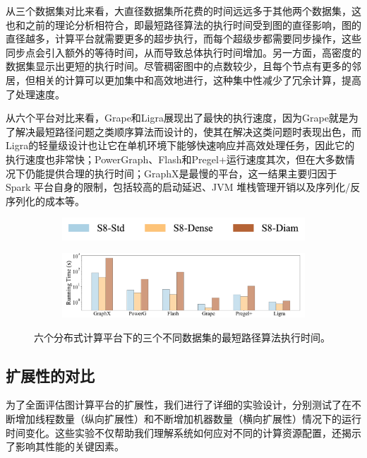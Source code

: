 从三个数据集对比来看，大直径数据集所花费的时间远远多于其他两个数据集，这也和之前的理论分析相符合，即最短路径算法的执行时间受到图的直径影响，图的直径越多，计算平台就需要更多的超步执行，而每个超级步都需要同步操作，这些同步点会引入额外的等待时间，从而导致总体执行时间增加。另一方面，高密度的数据集显示出更短的执行时间。尽管稠密图中的点数较少，且每个节点有更多的邻居，但相关的计算可以更加集中和高效地进行，这种集中性减少了冗余计算，提高了处理速度。

从六个平台对比来看，Grape和Ligra展现出了最快的执行速度，因为Grape就是为了解决最短路径问题之类顺序算法而设计的，使其在解决这类问题时表现出色，而Ligra的轻量级设计也让它在单机环境下能够快速响应并高效处理任务，因此它的执行速度也非常快；PowerGraph、Flash和Pregel+运行速度其次，但在大多数情况下仍能提供合理的执行时间；GraphX是最慢的平台，这一结果主要归因于 Spark 平台自身的限制，包括较高的启动延迟、JVM 堆栈管理开销以及序列化/反序列化的成本等。

\begin{figure}[h]\centering
    \begin{subfigure}[b]{0.7\textwidth}
        \includegraphics[width=\textwidth]{figures/legend_horizontal.pdf}
    \end{subfigure}

    \begin{subfigure}[b]{0.8\textwidth}
		\includegraphics[width=\textwidth]{figures/algorithm-sensitivity-SSSP.pdf}
	\end{subfigure}
    \caption{六个分布式计算平台下的三个不同数据集的最短路径算法执行时间。}
    \label{C9-fig1}
\end{figure}

\subsection{扩展性的对比}

为了全面评估图计算平台的扩展性，我们进行了详细的实验设计，分别测试了在不断增加线程数量（纵向扩展性）和不断增加机器数量（横向扩展性）情况下的运行时间变化。这些实验不仅帮助我们理解系统如何应对不同的计算资源配置，还揭示了影响其性能的关键因素。

